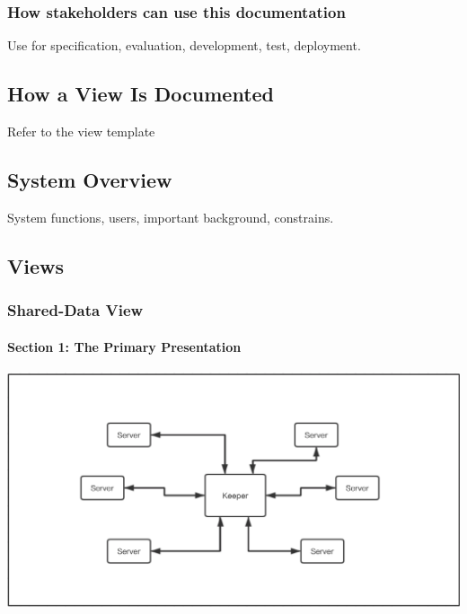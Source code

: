 \documentclass{article}
\begin{document}
	\subsubsection{How stakeholders can use this documentation}
	Use for specification, evaluation, development, test, deployment.

	\subsection{How a View Is Documented}
	Refer to the view template

	\subsection{System Overview}
	System functions, users, important background, constrains.
	
	\subsection{Views}

		\subsubsection{Shared-Data View} 
			\paragraph{Section 1: The Primary Presentation}
			\begin{center}
			\includegraphics[scale=0.3]{share.png}
			\end{center}
\end{document}

